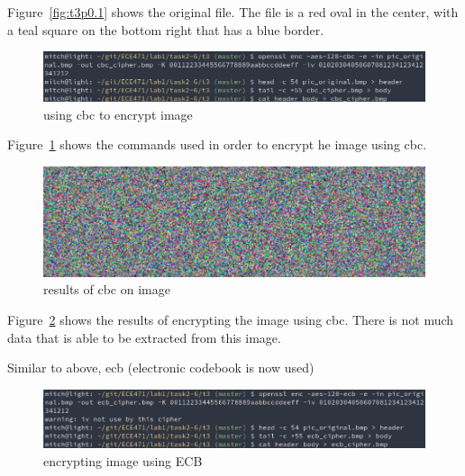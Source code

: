 \documentclass[12pt]{article}
\begin{document}
Figure~\ref{fig:t3p0.1} shows the original file. The file is a red oval in the center, with a
teal square on the bottom right that has a blue border.

\begin{figure}[H]
    \begin{center}
        \includegraphics[scale=0.48]{t3p0.png}
    \end{center}{}
    \caption{using cbc to encrypt image}
    \label{fig:t3p0}
\end{figure}

Figure~\ref{fig:t3p0} shows the commands used in order to encrypt he image using cbc.


\begin{figure}[H]
    \begin{center}
        \includegraphics[scale=0.48]{t3p1.png}
    \end{center}{}
    \caption{results of cbc on image}
    \label{fig:t3p1}
\end{figure}

Figure~\ref{fig:t3p1} shows the results of encrypting the image using cbc. There is not much data that
is able to be extracted from this image.

Similar to above, ecb (electronic codebook is now used)

\begin{figure}[H]
    \begin{center}
        \includegraphics[scale=0.48]{t3p2.png}
    \end{center}{}
    \caption{encrypting image using ECB}
    \label{fig:t3p2}
\end{figure}
\end{document}
